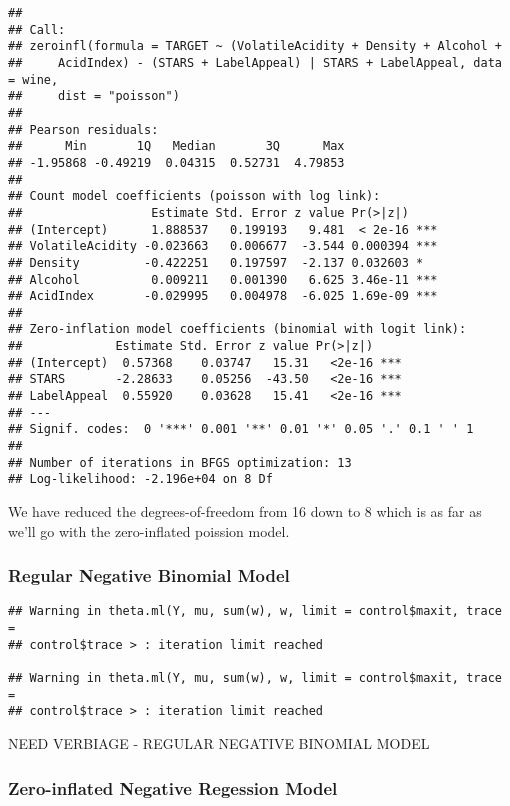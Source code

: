 \documentclass[]{article}
\begin{document}
\begin{verbatim}
## 
## Call:
## zeroinfl(formula = TARGET ~ (VolatileAcidity + Density + Alcohol + 
##     AcidIndex) - (STARS + LabelAppeal) | STARS + LabelAppeal, data = wine, 
##     dist = "poisson")
## 
## Pearson residuals:
##      Min       1Q   Median       3Q      Max 
## -1.95868 -0.49219  0.04315  0.52731  4.79853 
## 
## Count model coefficients (poisson with log link):
##                  Estimate Std. Error z value Pr(>|z|)    
## (Intercept)      1.888537   0.199193   9.481  < 2e-16 ***
## VolatileAcidity -0.023663   0.006677  -3.544 0.000394 ***
## Density         -0.422251   0.197597  -2.137 0.032603 *  
## Alcohol          0.009211   0.001390   6.625 3.46e-11 ***
## AcidIndex       -0.029995   0.004978  -6.025 1.69e-09 ***
## 
## Zero-inflation model coefficients (binomial with logit link):
##             Estimate Std. Error z value Pr(>|z|)    
## (Intercept)  0.57368    0.03747   15.31   <2e-16 ***
## STARS       -2.28633    0.05256  -43.50   <2e-16 ***
## LabelAppeal  0.55920    0.03628   15.41   <2e-16 ***
## ---
## Signif. codes:  0 '***' 0.001 '**' 0.01 '*' 0.05 '.' 0.1 ' ' 1 
## 
## Number of iterations in BFGS optimization: 13 
## Log-likelihood: -2.196e+04 on 8 Df
\end{verbatim}

We have reduced the degrees-of-freedom from 16 down to 8 which is as far
as we'll go with the zero-inflated poission model.

\subsubsection{Regular Negative Binomial
Model}\label{regular-negative-binomial-model}

\begin{verbatim}
## Warning in theta.ml(Y, mu, sum(w), w, limit = control$maxit, trace =
## control$trace > : iteration limit reached

## Warning in theta.ml(Y, mu, sum(w), w, limit = control$maxit, trace =
## control$trace > : iteration limit reached
\end{verbatim}

NEED VERBIAGE - REGULAR NEGATIVE BINOMIAL MODEL

\subsubsection{Zero-inflated Negative Regession
Model}\label{zero-inflated-negative-regession-model}
\end{document}
